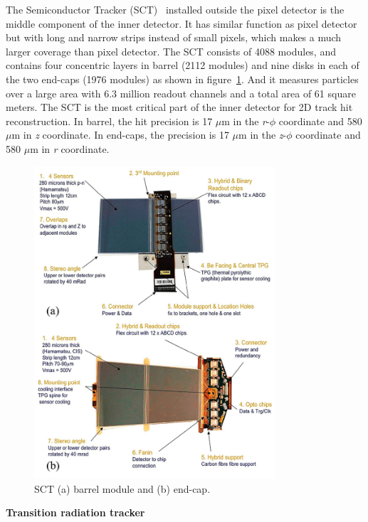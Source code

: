 The Semiconductor Tracker (SCT)~\cite{SCT_2007} installed outside the pixel detector is the middle component of the inner detector.
It has similar function as pixel detector but with long and narrow strips instead of small pixels, which makes a much larger coverage than pixel detector.
The SCT consists of 4088 modules, and contains four concentric layers in barrel (2112 modules) and nine disks in each of the two end-caps (1976 modules) as shown in figure~\ref{fig:inner_sct}.
And it measures particles over a large area with 6.3 million readout channels and a total area of 61 square meters.
The SCT is the most critical part of the inner detector for 2D track hit reconstruction.
In barrel, the hit precision is 17 $\mu$m in the \textit{r}-$\phi$ coordinate and 580 $\mu$m in \textit{z} coordinate.
In end-caps, the precision is 17 $\mu$m in the \textit{z}-$\phi$ coordinate and 580 $\mu$m in \textit{r} coordinate.
\begin{figure}[!htb]
  \centering
  \includegraphics[width=0.8\textwidth]{figures/Detector/inner_SCT.png}
  \caption{SCT (a) barrel module and (b) end-cap\cite{Sultan:phdthesis}.}
  \label{fig:inner_sct}
\end{figure}

\textbf{Transition radiation tracker}


